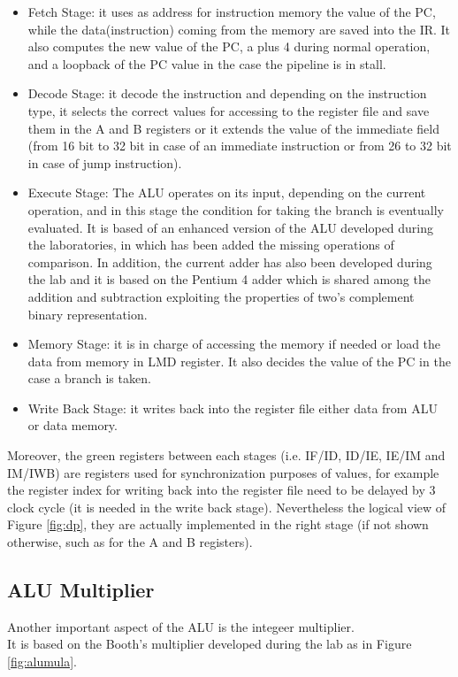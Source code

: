 \begin{itemize}
\item Fetch Stage: it uses as address for instruction memory the value of the PC, while the data(instruction) coming from the memory are saved into the IR. It also computes the new value of the PC, a plus 4 during normal operation, and a loopback of the PC value in the case the pipeline is in stall.
\item Decode Stage: it decode the instruction and depending on the instruction type, it selects the correct values for accessing to the register file and save them in the A and B registers or it extends the value of the immediate field (from 16 bit to 32 bit in case of an immediate instruction or from 26 to 32 bit in case of jump instruction).
\item Execute Stage: The ALU operates on its input, depending on the current operation, and in this stage the condition for taking the branch is eventually evaluated. It is based of an enhanced version of the ALU developed during the laboratories, in which has been added the missing operations of comparison. In addition, the current adder has also been developed during the lab and it is based on the Pentium 4 adder which is shared among the addition and subtraction exploiting the properties of two's complement binary representation.
\item Memory Stage: it is in charge of accessing the memory if needed or load the data from memory in LMD register. It also decides the value of the PC in the case a branch is taken.
\item Write Back Stage: it writes back into the register file either data from ALU or data memory.
\end{itemize}

Moreover, the green registers between each stages (i.e. IF/ID, ID/IE, IE/IM and IM/IWB) are registers used for synchronization purposes of values, for example the register index for writing back into the register file need to be delayed by 3 clock cycle (it is needed in the write back stage). Nevertheless the logical view of Figure \ref{fig:dp}, they are actually implemented in the right stage (if not shown otherwise, such as for the A and B registers).


\subsection{ALU Multiplier} 
Another important aspect of the ALU is the integeer multiplier.\\
It is based on the Booth's multiplier developed during the lab as in Figure \ref{fig:alumula}.

